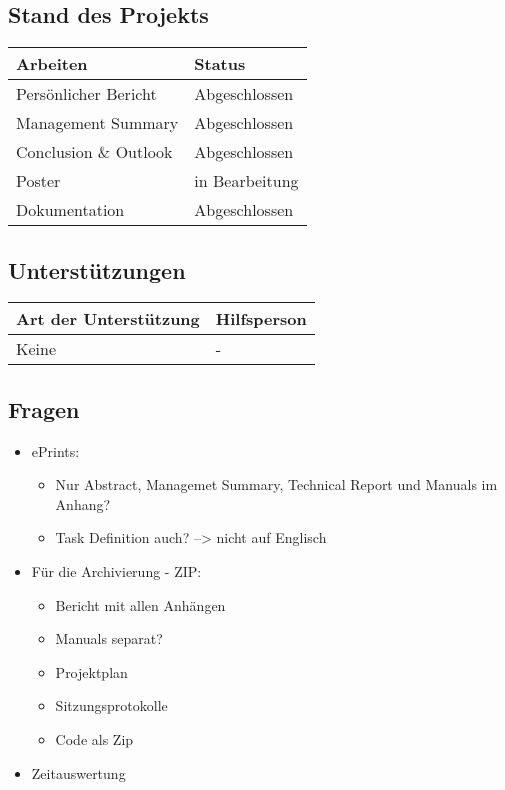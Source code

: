 \subsection*{Stand des Projekts}
\begin{table}[H]
    \centering
    \begin{tabular}{p{12cm} p{4cm}}
        \textbf{Arbeiten} & \textbf{Status} \\ \hline
        Persönlicher Bericht & Abgeschlossen \\ \hline
        Management Summary & Abgeschlossen \\ \hline
        Conclusion \& Outlook & Abgeschlossen \\ \hline
        Poster & in Bearbeitung \\ \hline
        Dokumentation & Abgeschlossen \\ \hline
    \end{tabular}
\end{table}

\vspace{1cm}

\subsection*{Unterstützungen}
\begin{table}[H]
    \centering
    \begin{tabular}{p{12cm} p{4cm}}
        \textbf{Art der Unterstützung} & \textbf{Hilfsperson} \\ \hline
        Keine & - \\ \hline
    \end{tabular}
\end{table}

\vspace{1cm}

\subsection*{Fragen}
\begin{itemize}
    \item ePrints:
    \begin{itemize}
        \item Nur Abstract, Managemet Summary, Technical Report und Manuals im Anhang?
        \item Task Definition auch? --> nicht auf Englisch
    \end{itemize}
    \item Für die Archivierung - ZIP:
    \begin{itemize}
        \item Bericht mit allen Anhängen
        \item Manuals separat?
        \item Projektplan
        \item Sitzungsprotokolle
        \item Code als Zip
    \end{itemize}
    \item Zeitauswertung    
\end{itemize}

